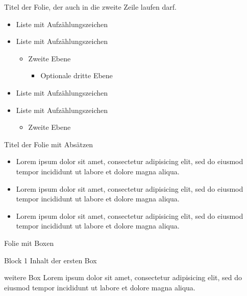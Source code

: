 \documentclass[]{beamer}
\begin{document}
\begin{frame}{Titel der Folie, der auch in die zweite Zeile laufen darf.}
  \begin{itemize}
    \item Liste mit Aufzählungszeichen
    \item Liste mit Aufzählungszeichen
      \begin{itemize}
        \item Zweite Ebene
          \begin{itemize}
            \item Optionale dritte Ebene
          \end{itemize}
      \end{itemize}
    \item Liste mit Aufzählungszeichen
    \item Liste mit Aufzählungszeichen
      \begin{itemize}
        \item Zweite Ebene
      \end{itemize}
  \end{itemize}
\end{frame}

\begin{frame}{Titel der Folie mit Absätzen}
  \begin{itemize}
    \item Lorem ipsum dolor sit amet, consectetur adipisicing elit, sed do eiusmod tempor incididunt ut labore et dolore magna aliqua.
    \item Lorem ipsum dolor sit amet, consectetur adipisicing elit, sed do eiusmod tempor incididunt ut labore et dolore magna aliqua.
    \item Lorem ipsum dolor sit amet, consectetur adipisicing elit, sed do eiusmod tempor incididunt ut labore et dolore magna aliqua.
  \end{itemize}
\end{frame}

\begin{frame}{Folie mit Boxen}
  \begin{block}{Block 1}
    Inhalt der ersten Box
  \end{block}
  \begin{block}{weitere Box}
    Lorem ipsum dolor sit amet, consectetur adipisicing elit, sed do eiusmod tempor incididunt ut labore et dolore magna aliqua.
  \end{block}
\end{frame}
\end{document}

